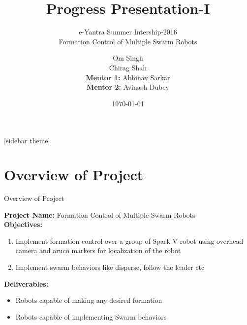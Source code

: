 \documentclass[11pt, a4paper]{beamer}
\begin{document}
	\title{Progress Presentation-I}
	\subtitle{e-Yantra Summer Intership-2016 \\ Formation Control of Multiple Swarm Robots}
	
		\author
		{Om Singh\\ Chirag Shah\\
		 \textbf{Mentor 1:} Abhinav Sarkar\\
		 \textbf{Mentor 2:} Avinash Dubey			
		}

	
	\date{\today}
	\frame{\titlepage}

[sidebar theme]
\section{Overview of Project}
\begin{frame}{Overview of Project}

	\textbf{Project Name:} 	 Formation Control of Multiple Swarm Robots\\
	\textbf{Objectives:} \\
		\begin{enumerate}
		
		
			\item Implement formation control over a group of Spark V robot using overhead camera and aruco markers for localization of the robot
			\item Implement swarm behaviors like disperse, follow the leader etc
		\end{enumerate}
	
	\textbf{Deliverables:}
	\begin{itemize}
		\item Robots capable of making any desired formation
		\item Robots capable of implementing Swarm behaviors
	\end{itemize}

\end{frame}
\end{document}
